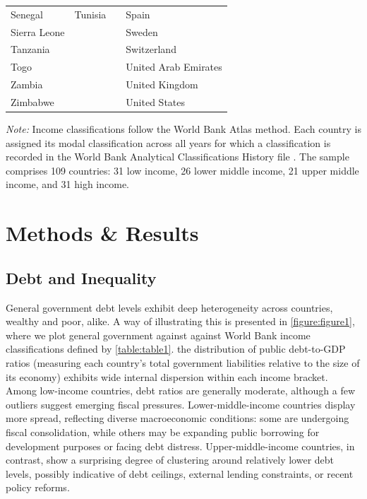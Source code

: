 \documentclass[12pt, titlepage]{article}
\numberwithin{equation}{section}
\begin{document}
\begin{table}[htbp]
\begin{threeparttable}
\begin{tabular}{llll}
			Senegal & Tunisia & & Spain \\
			Sierra Leone & & & Sweden \\
			Tanzania & & & Switzerland \\
			Togo & & & United Arab Emirates \\
			Zambia & & & United Kingdom \\
			Zimbabwe & & & United States \\
			\bottomrule
		\end{tabular}
		\begin{tablenotes}
			\scriptsize
			\item \textit{Note:} Income classifications follow the World Bank Atlas
			method. Each country is assigned its modal classification across all
			years for which a classification is recorded in the World Bank Analytical
			Classifications History file \citep{WorldBankClassifications}. The sample
			comprises 109 countries: 31 low income, 26 lower middle income, 21 upper
			middle income, and 31 high income.
		\end{tablenotes}
	\end{threeparttable}
\end{table}

	\section{Methods \& Results}

	\subsection{Debt and Inequality}

	General government debt levels exhibit deep heterogeneity across countries, wealthy and poor, alike. A way of illustrating this is presented in \autoref{figure:figure1}, where we plot general government against against World Bank income classifications defined by \autoref{table:table1}. the distribution of public debt-to-GDP ratios (measuring each country's total government liabilities relative to the size of its economy) exhibits wide internal dispersion within each income bracket. Among low-income countries, debt ratios are generally moderate, although a few outliers suggest emerging fiscal pressures. Lower-middle-income countries display more spread, reflecting diverse macroeconomic conditions: some are undergoing fiscal consolidation, while others may be expanding public borrowing for development purposes or facing debt distress. Upper-middle-income countries, in contrast, show a surprising degree of clustering around relatively lower debt levels, possibly indicative of debt ceilings, external lending constraints, or recent policy reforms.
\end{document}
